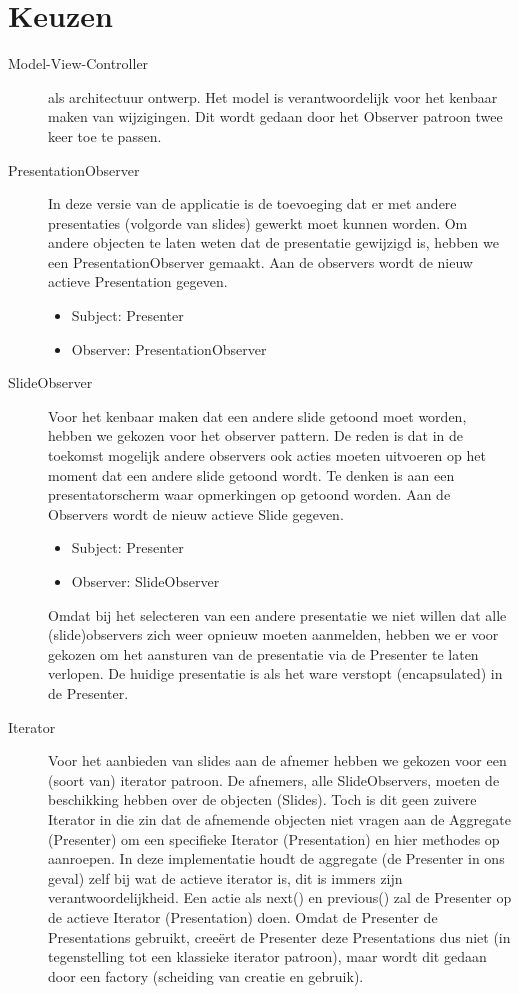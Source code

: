 \documentclass[a4paper]{article}
\begin{document}
\section{Keuzen}
\begin{description}
\item[Model-View-Controller] als architectuur ontwerp. Het model is verantwoordelijk voor het kenbaar maken van wijzigingen. Dit wordt gedaan door het Observer patroon twee keer toe te passen.
\item[PresentationObserver] In deze versie van de applicatie is de toevoeging dat er met andere presentaties (volgorde van slides) gewerkt moet kunnen worden. Om andere objecten te laten weten dat de presentatie gewijzigd is, hebben we een PresentationObserver gemaakt. Aan de observers wordt de nieuw actieve Presentation gegeven.
\begin{itemize}
\item Subject: Presenter
\item Observer: PresentationObserver
\end{itemize}
\item[SlideObserver] Voor het kenbaar maken dat een andere slide getoond moet worden, hebben we gekozen voor het observer pattern. De reden is dat in de toekomst mogelijk andere observers ook acties moeten uitvoeren op het moment dat een andere slide getoond wordt. Te denken is aan een presentatorscherm waar opmerkingen op getoond worden. Aan de Observers wordt de nieuw actieve Slide gegeven.
\begin{itemize}
\item Subject: Presenter
\item Observer: SlideObserver
\end{itemize}
Omdat bij het selecteren van een andere presentatie we niet willen dat alle (slide)observers zich weer opnieuw moeten aanmelden, hebben we er voor gekozen om het aansturen van de presentatie via de Presenter te laten verlopen. De huidige presentatie is als het ware verstopt (encapsulated) in de Presenter.
\item[Iterator] Voor het aanbieden van slides aan de afnemer hebben we gekozen voor een (soort van) iterator patroon. De afnemers, alle SlideObservers, moeten de beschikking hebben over de objecten (Slides). Toch is dit geen zuivere Iterator in die zin dat de afnemende objecten niet vragen aan de Aggregate (Presenter) om een specifieke Iterator (Presentation) en hier methodes op aanroepen. In deze implementatie houdt de aggregate (de Presenter in ons geval) zelf bij wat de actieve iterator is, dit is immers zijn verantwoordelijkheid. Een actie als next() en previous() zal de Presenter op de actieve Iterator (Presentation) doen. Omdat de Presenter de Presentations gebruikt, creeërt de Presenter deze Presentations dus niet (in tegenstelling tot een klassieke iterator patroon), maar wordt dit gedaan door een factory (scheiding van creatie en gebruik).

\end{description}
\end{document}
